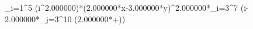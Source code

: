 \sum_{i=1}^{5} (i^2.000000)*(2.000000*x-3.000000*y)^2.000000*\sum_{i=3}^{7} (i-2.000000*\sum_{j=3}^{10} (2.000000*+))